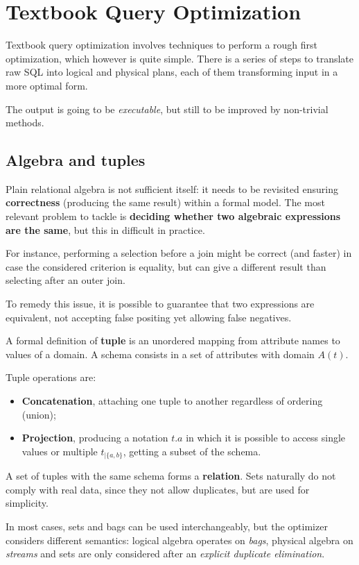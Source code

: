
\section{Textbook Query Optimization}
Textbook query optimization involves techniques to perform a rough first optimization, which however is quite simple. There is a series of steps to translate raw SQL into logical and physical plans, each of them transforming input in a more optimal form.

The output is going to be \textit{executable}, but still to be improved by non-trivial methods.

\subsection{Algebra and tuples}
Plain relational algebra is not sufficient itself: it needs to be revisited ensuring \textbf{correctness} (producing the same result) within a formal model. The most relevant problem to tackle is \textbf{deciding whether two algebraic expressions are the same}, but this in difficult in practice.

For instance, performing a selection before a join might be correct (and faster) in case the considered criterion is equality, but can give a different result than selecting after an outer join. 

To remedy this issue, it is possible to guarantee that two expressions are equivalent, not accepting false positing yet allowing false negatives. 

A formal definition of \textbf{tuple} is an unordered mapping from attribute names to values of a domain. A schema consists in a set of attributes with domain $A(t)$.

Tuple operations are:
\begin{itemize}
	\item \textbf{Concatenation}, attaching one tuple to another regardless of ordering (union);
	\item \textbf{Projection}, producing a notation $t.a$ in which it is possible to access single values or multiple $t_{|\{a, b\}}$, getting a subset of the schema.
\end{itemize}

A set of tuples with the same schema forms a \textbf{relation}. Sets naturally do not comply with real data, since they not allow duplicates, but are used for simplicity.

In most cases, sets and bags can be used interchangeably, but the optimizer considers different semantics: logical algebra operates on \textit{bags}, physical algebra on \textit{streams} and sets are only considered after an \textit{explicit duplicate elimination}.

